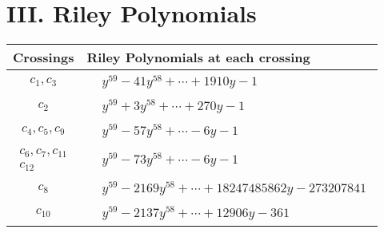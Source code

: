 \documentclass[1p]{elsarticle_modified}
\theoremstyle{definition}
\begin{document}
\centering \section*{ III. Riley Polynomials}
\begin{tabular}{m{50pt}|m{274pt}}
Crossings & \hspace{64pt}Riley Polynomials at each crossing \\
\hline $$\begin{aligned}c_{1},c_{3}\end{aligned}$$&$\begin{aligned}
&y^{59}-41 y^{58}+\cdots+1910 y-1
\end{aligned}$\\
\hline $$\begin{aligned}c_{2}\end{aligned}$$&$\begin{aligned}
&y^{59}+3 y^{58}+\cdots+270 y-1
\end{aligned}$\\
\hline $$\begin{aligned}c_{4},c_{5},c_{9}\end{aligned}$$&$\begin{aligned}
&y^{59}-57 y^{58}+\cdots-6 y-1
\end{aligned}$\\
\hline $$\begin{aligned}c_{6},c_{7},c_{11}\\c_{12}\end{aligned}$$&$\begin{aligned}
&y^{59}-73 y^{58}+\cdots-6 y-1
\end{aligned}$\\
\hline $$\begin{aligned}c_{8}\end{aligned}$$&$\begin{aligned}
&y^{59}-2169 y^{58}+\cdots+18247485862 y-273207841
\end{aligned}$\\
\hline $$\begin{aligned}c_{10}\end{aligned}$$&$\begin{aligned}
&y^{59}-2137 y^{58}+\cdots+12906 y-361
\end{aligned}$\\
\hline
\end{tabular}
\vskip 2pc
\end{document}
